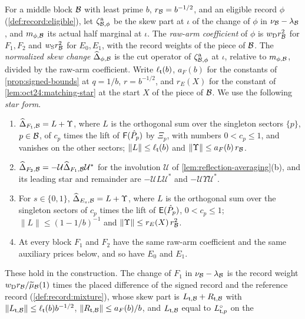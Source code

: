 For a middle block $\mathcal B$ with least prime $b$, $r_\mathcal B=b^{-1/2}$, and an eligible
record $\phi$ (\cref{def:record:eligible}), let $\zeta^{\rm a}_{\mathcal B,\phi}$ be the skew
part at $\iota$ of the change of $\phi$ in $\nu_\mathcal B-\lambda_\mathcal B$, and $m_{\phi,\mathcal B}$ its
actual half marginal at $\iota$. The \emph{raw-arm coefficient} of $\phi$ is
$w_{\rm D}r_\mathcal B^2$ for $F_1,F_2$ and $w_{\rm S}r_\mathcal B^2$ for $E_0,E_1$, with the record
weights of the piece of $\mathcal B$. The \emph{normalized skew change}
$\widehat\Delta_{\phi,\mathcal B}$ is the cut operator of $\zeta^{\rm a}_{\mathcal B,\phi}$ at $\iota$,
relative to $m_{\phi,\mathcal B}$, divided by the raw-arm coefficient. Write
$\ell_\mathsf t(b)$, $a_F(b)$ for the constants of \cref{prop:signed-bounds} at $q=1/b$,
$r=b^{-1/2}$, and $r_E(X)$ for the constant of \cref{lem:oct24:matching-star} at the
start $X$ of the piece of $\mathcal B$. We use the
following \emph{star form}.
\begin{enumerate}[label=(N\arabic*)]
\item\label{it:env:N1} $\widehat\Delta_{F_1,\mathcal B}=L+\Upsilon$, where $L$ is the
 orthogonal sum over the singleton sectors $\{p\}$, $p\in\mathcal B$, of $c_p$ times the
 lift of $\mathsf F(\hat P_p)$ by $\Xi_p$, with numbers $0<c_p\le1$, and vanishes on the
 other sectors; $\|L\|\le\ell_\mathsf t(b)$ and $\|\Upsilon\|\le a_F(b)\,r_\mathcal B$.
\item\label{it:env:N2} $\widehat\Delta_{F_2,\mathcal B}=-\mathcal U\widehat\Delta_{F_1,\mathcal B}
 \mathcal U^*$ for the involution $\mathcal U$ of
 \cref{lem:reflection-averaging}(b), and its leading star and remainder are
 $-\mathcal UL\mathcal U^*$ and $-\mathcal U\Upsilon\mathcal U^*$.
\item\label{it:env:N3} For $s\in\{0,1\}$, $\widehat\Delta_{E_s,\mathcal B}=L+\Upsilon$,
 where $L$ is the orthogonal sum over the singleton sectors of $c_p$ times the lift
 of $\mathsf E(\hat P_p)$, $0<c_p\le1$; $\|L\|\le(1-1/b)^{-1}$ and
 $\|\Upsilon\|\le r_E(X)\,r_\mathcal B^2$.
\item\label{it:env:N4} At every block $F_1$ and $F_2$ have the same raw-arm
 coefficient and the same auxiliary prices below, and so have $E_0$ and $E_1$.
\end{enumerate}
These hold in the construction. The change of $F_1$ in $\nu_\mathcal B-\lambda_\mathcal B$ is the
record weight $w_{\rm D}r_\mathcal B/\widetilde\mu_\mathcal B(1)$ times the placed difference of the
signed record and the reference record (\cref{def:record:mixture}), whose skew part
is $L_{\mathsf t,\mathcal B}+R_{\mathsf t,\mathcal B}$ with $\|L_{\mathsf t,\mathcal B}\|\le\ell_\mathsf t(b)b^{-1/2}$,
$\|R_{\mathsf t,\mathcal B}\|\le a_F(b)/b$, and $L_{\mathsf t,\mathcal B}$ equal to $L^\circ_{\mathsf t,p}$ on the
